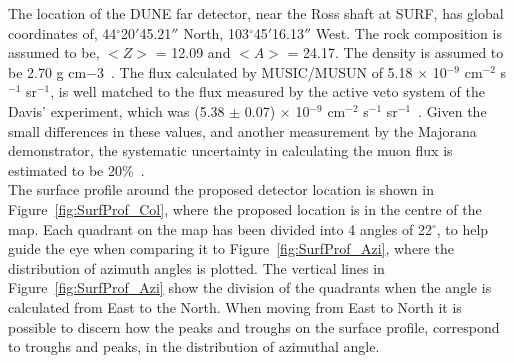 The location of the DUNE far detector, near the Ross shaft at SURF, has global coordinates of, 44$^{\circ}$20$'$45.21$''$ North, 103$^{\circ}$45$'$16.13$''$ West. The rock composition is assumed to be, $< Z >$ = 12.09 and $< A >$ = 24.17. The density is assumed to be 2.70 g cm${-3}$~\citep{Mei:2009py}. The flux calculated by MUSIC/MUSUN of 5.18 $\times$ 10$^{-9}$ cm$^{-2}$ s$^{-1}$ sr$^{-1}$, is well matched to the flux measured by the active veto system of the Davis' experiment, which was (5.38 $\pm$ 0.07) $\times$ 10$^{-9}$ cm$^{-2}$ s$^{-1}$ sr$^{-1}$~\citep{PhysRevD.27.1444}. Given the small differences in these values, and another measurement by the Majorana demonstrator, the systematic uncertainty in calculating the muon flux is estimated to be 20\%~\citep{NDKTFNote}. \\

The surface profile around the proposed detector location is shown in Figure~\ref{fig:SurfProf_Col}, where the proposed location is in the centre of the map. Each quadrant on the map has been divided into 4 angles of 22$^{\circ}$, to help guide the eye when comparing it to Figure~\ref{fig:SurfProf_Azi}, where the distribution of azimuth angles is plotted. The vertical lines in Figure~\ref{fig:SurfProf_Azi} show the division of the quadrants when the angle is calculated from East to the North. When moving from East to North it is possible to discern how the peaks and troughs on the surface profile, correspond to troughs and peaks, in the distribution of azimuthal angle. \\

